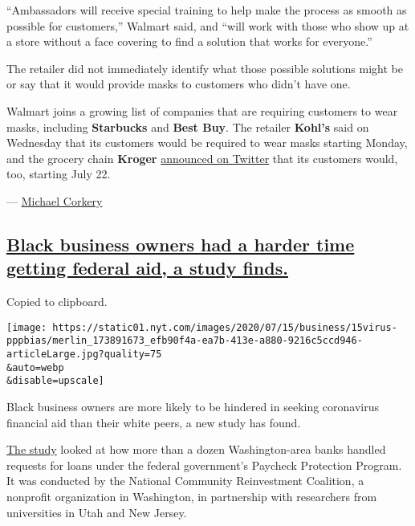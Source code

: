 ``Ambassadors will receive special training to help make the process as
smooth as possible for customers,'' Walmart said, and ``will work with
those who show up at a store without a face covering to find a solution
that works for everyone.''

The retailer did not immediately identify what those possible solutions
might be or say that it would provide masks to customers who didn't have
one.

Walmart joins a growing list of companies that are requiring customers
to wear masks, including \textbf{Starbucks} and \textbf{Best Buy}. The
retailer \textbf{Kohl's} said on Wednesday that its customers would be
required to wear masks starting Monday, and the grocery chain
\textbf{Kroger}
\href{https://twitter.com/KrogerNews/status/1283496129825513474}{announced
on Twitter} that its customers would, too, starting July 22.

--- \href{https://www.nytimes.com/by/michael-corkery}{Michael Corkery}

\hypertarget{black-business-owners-had-a-harder-time-getting-federal-aid-a-study-finds}{%
\subsection{\texorpdfstring{\protect\hyperlink{black-business-owners-had-a-harder-time-getting-federal-aid-a-study-finds}{Black
business owners had a harder time getting federal aid, a study
finds.}}{Black business owners had a harder time getting federal aid, a study finds.}}\label{black-business-owners-had-a-harder-time-getting-federal-aid-a-study-finds}}

Copied to clipboard.

\texttt{[image: https://static01.nyt.com/images/2020/07/15/business/15virus-pppbias/merlin\_173891673\_efb90f4a-ea7b-413e-a880-9216c5ccd946-articleLarge.jpg?quality=75\\\&auto=webp\\\&disable=upscale]}

Black business owners are more likely to be hindered in seeking
coronavirus financial aid than their white peers, a new study has found.

\href{https://ncrc.org/despite-gaping-holes-in-government-data-tests-show-ppp-borrowers-faced-discrimination/}{The
study} looked at how more than a dozen Washington-area banks handled
requests for loans under the federal government's Paycheck Protection
Program. It was conducted by the National Community Reinvestment
Coalition, a nonprofit organization in Washington, in partnership with
researchers from universities in Utah and New Jersey.

